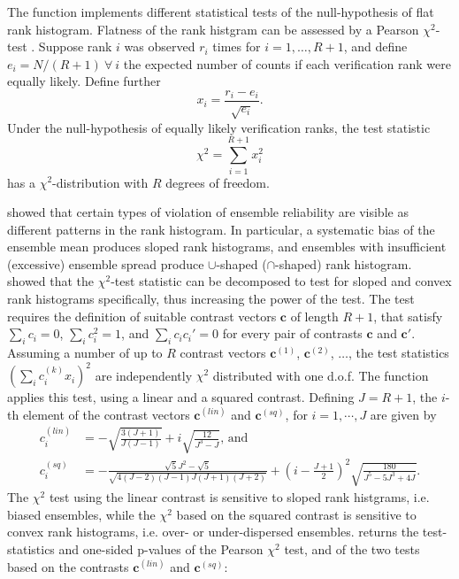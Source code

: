 \documentclass[article]{jss}\usepackage{graphicx, color}
\begin{document}
The function  implements different statistical tests of the null-hypothesis of flat rank histogram.
Flatness of the rank histgram can be assessed by a Pearson $\chi^2$-test \citep{pearson1900criterion}.
Suppose rank $i$ was observed $r_i$ times for $i=1,\dots,R+1$, and define $e_i=N/(R+1)\ \forall\ i$ the expected number of counts if each verification rank were equally likely.
Define further
\begin{equation}
x_i = \frac{r_i - e_i}{\sqrt{e_i}}.
\end{equation}
%
Under the null-hypothesis of equally likely verification ranks, the test statistic
%
\begin{equation}
\chi^2 = \sum_{i=1}^{R+1} x_i^2
\end{equation}
%
has a $\chi^2$-distribution with $R$ degrees of freedom.


\citet{hamill2001interpretation} showed that certain types of violation of ensemble reliability are visible as different patterns in the rank histogram.
In particular, a systematic bias of the ensemble mean produces sloped rank histograms, and ensembles with insufficient (excessive) ensemble spread produce $\cup$-shaped ($\cap$-shaped) rank histogram.
\citet{jolliffe2008evaluating} showed that the $\chi^2$-test statistic can be decomposed to test for sloped and convex rank histograms specifically, thus increasing the power of the test.
The test requires the definition of suitable contrast vectors $\mathbf{c}$ of length $R+1$, that satisfy $\sum_i c_i = 0$, $\sum_i c_i^2 = 1$, and $\sum_i c_i c_i' = 0$ for every pair of contrasts $\mathbf{c}$ and $\mathbf{c}'$.
Assuming a number of up to $R$ contrast vectors $\mathbf{c}^{(1)}$, $\mathbf{c}^{(2)}$, $\dots$, the test statistics $(\sum_i c^{(k)}_i x_i)^2$ are independently $\chi^2$ distributed with one d.o.f. 
The function  applies this test, using a linear and a squared contrast. 
Defining $J=R+1$, the $i$-th element of the contrast vectors $\mathbf{c}^{(lin)}$ and $\mathbf{c}^{(sq)}$, for $i=1,\cdots,J$ are given by
%
\begin{align}
c^{(lin)}_i & = -\sqrt{\frac{3(J+1)}{J (J-1)}} + i \sqrt{\frac{12}{J^3 - J}}\text{, and}\\
c^{(sq)}_i & =  - \frac{\sqrt{5}  J^2 - \sqrt{5}}{\sqrt{4(J - 2)  (J-1) J (J+1) (J+2)}}+ \left(i - \frac{J+1}{2}\right)^2   \sqrt{\frac{180}{ J^5 - 5 J^3 + 4 J}}.
\end{align}
%
The $\chi^2$ test using the linear contrast is sensitive to sloped rank histgrams, i.e. biased ensembles, while the $\chi^2$ based on the squared contrast is sensitive to convex rank histograms, i.e. over- or under-dispersed ensembles.
 returns the test-statistics and one-sided p-values of the Pearson $\chi^2$ test, and of the two tests based on the contrasts $\mathbf{c}^{(lin)}$ and $\mathbf{c}^{(sq)}$:
\end{document}
